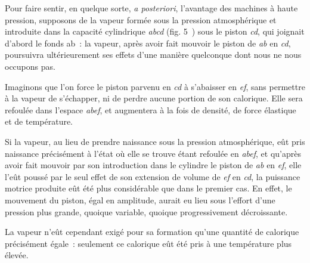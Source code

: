 \documentclass[french,twoside]{book} %
\begin{document}
Pour faire sentir, en quelque sorte, \emph{a posteriori}, l’avantage des machines à haute pression, supposons de la vapeur formée sous la pression atmosphérique et introduite dans la capacité cylindrique \emph{abcd} (fig. 5 ) sous le piston \emph{cd}, qui joignait d’abord le fonds ab : la vapeur, après avoir fait mouvoir le piston de \emph{ab} en \emph{cd}, poursuivra ultérieurement ses effets d’une manière quelconque dont nous ne nous occupons pas.\par
Imaginons que l’on force le piston parvenu en \emph{cd} à s’abaisser en \emph{ef}, sans permettre à la vapeur de s’échapper, ni de perdre aucune portion de son calorique. Elle sera refoulée dans l’espace \emph{abef}, et augmentera à la fois de densité, de force élastique et de température.\par
Si la vapeur, au lieu de prendre naissance sous la pression atmosphérique, eût pris naissance précisément à l’état où elle se trouve étant refoulée en \emph{abef}, et qu’après avoir fait mouvoir par son introduction dans le cylindre le piston de \emph{ab} en \emph{ef}, elle l’eût poussé par le seul effet de son extension de volume de \emph{ef} en \emph{cd}, la puissance motrice produite eût été plus considérable que dans le premier cas. En effet, le mouvement du piston, égal en amplitude, aurait eu lieu sous l’effort d’une pression plus grande, quoique variable, quoique progressivement décroissante.\par
La vapeur n’eût cependant exigé pour sa formation qu’une quantité de calorique précisément égale : seulement ce calorique eût été pris à une température plus élevée.\par
\end{document}
